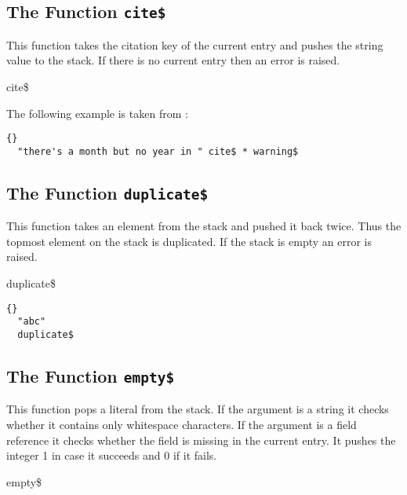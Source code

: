\subsection{The Function \texttt{cite\$}}%

This function takes the citation key of the current entry and pushes
the string value to the stack. If there is no current entry then an
error is raised.

\begin{BstFunction}{cite\$}
\end{BstFunction}

The following example is taken from :

\begin{lstlisting}{}
  "there's a month but no year in " cite$ * warning$
\end{lstlisting}


\subsection{The Function \texttt{duplicate\$}}%

This function takes an element from the stack and pushed it back
twice. Thus the topmost element on the stack is duplicated. If the
stack is empty an error is raised.

\begin{BstFunction}{duplicate\$}
\end{BstFunction}

\begin{lstlisting}{}
  "abc"
  duplicate$
\end{lstlisting}

\subsection{The Function \texttt{empty\$}}%

This function pops a literal from the stack. If the argument is a
string it checks whether it contains only whitespace characters. If
the argument is a field reference it checks whether the field is
missing in the current entry. It pushes the integer 1 in case it
succeeds and 0 if it fails.

\INCOMPLETE

\begin{BstFunction}{empty\$}
\end{BstFunction}

